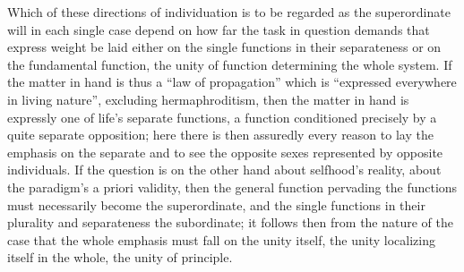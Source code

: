 \documentclass[12pt,a4paper]{book}
\begin{document}
Which of these directions of individuation is to be regarded as the superordinate
will in each single case depend on how far the task in question demands that
express weight be laid either on the single functions in their separateness or on
the fundamental function, the unity of function determining the whole system. If
the matter in hand is thus a ``law of propagation'' which is ``expressed
everywhere in living nature'', excluding hermaphroditism, then the matter in hand
is expressly one of life's separate functions, a function conditioned precisely by a quite separate
opposition; here there is then assuredly every reason to lay the emphasis on the
separate and to see the opposite sexes represented by opposite individuals. If the
question is on the other hand about selfhood's reality, about the paradigm's a
priori validity, then the general function pervading the functions must necessarily
become the superordinate, and the single functions in their plurality and
separateness the subordinate; it follows then from the nature of the case that the
whole emphasis must fall on the unity itself, the unity localizing itself in the
whole, the unity of principle.
\end{document}

